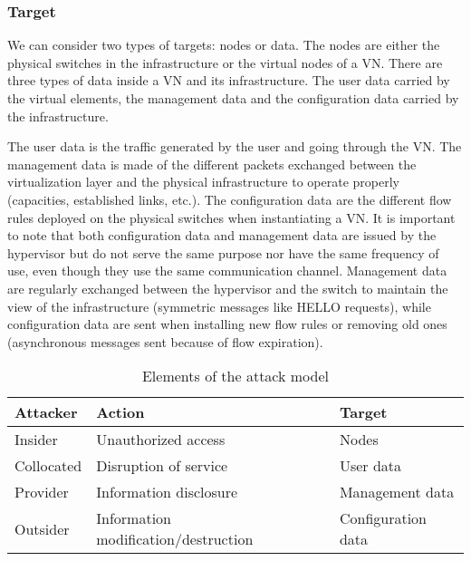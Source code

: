 \subsubsection{Target}
We can consider two types of targets: nodes or data.
The nodes are either the physical switches in the infrastructure or the virtual nodes of a VN.
There are three types of data inside a VN and its infrastructure.
The user data carried by the virtual elements, the management data and the configuration data carried by the infrastructure. 

The user data is the traffic generated by the user and going through the VN.
The management data is made of the different packets exchanged between the virtualization layer and the physical infrastructure to operate properly (capacities, established links, etc.).
The configuration data are the different flow rules deployed on the physical switches when instantiating a VN.
It is important to note that both configuration data and management data are issued by the hypervisor but do not serve the same purpose nor have the same frequency of use, even though they use the same communication channel.
Management data are regularly exchanged between the hypervisor and the switch to maintain the view of the infrastructure (\eg symmetric messages like HELLO requests), while configuration data are sent when installing new flow rules or removing old ones (asynchronous messages sent because of flow expiration).

\begin{table}[h]
\centering
\begin{tabular}{|l|l|l|}
\hline
\textbf{Attacker}   & \textbf{Action}    & \textbf{Target}             \\ \hline
Insider    & Unauthorized access                  & Nodes              \\ \hline
Collocated & Disruption of service                & User data          \\ \hline
Provider   & Information disclosure               & Management data    \\ \hline
Outsider   & Information modification/destruction & Configuration data \\ \hline
\end{tabular}
\caption{Elements of the attack model}
\label{tab:attack-model}
\end{table}

